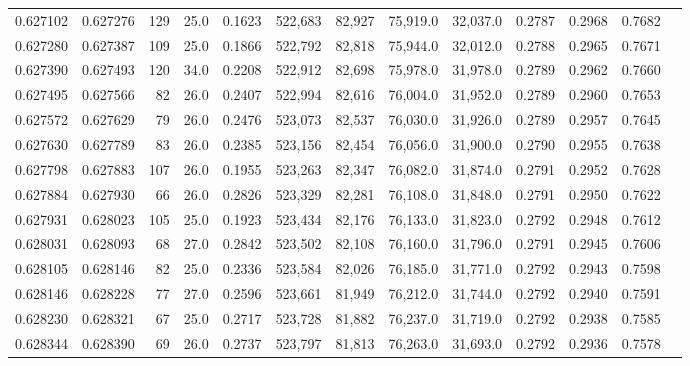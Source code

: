 \begin{tabular}{rrrrrrrrrrrrr}
0.627102 & 0.627276 &   129 & 25.0 &                                     0.1623 & 522,683 &  82,927 &  75,919.0 &  32,037.0 & 0.2787 & 0.2968 & 0.7682 \\
0.627280 & 0.627387 &   109 & 25.0 &                                     0.1866 & 522,792 &  82,818 &  75,944.0 &  32,012.0 & 0.2788 & 0.2965 & 0.7671 \\
0.627390 & 0.627493 &   120 & 34.0 &                                     0.2208 & 522,912 &  82,698 &  75,978.0 &  31,978.0 & 0.2789 & 0.2962 & 0.7660 \\
0.627495 & 0.627566 &    82 & 26.0 &                                     0.2407 & 522,994 &  82,616 &  76,004.0 &  31,952.0 & 0.2789 & 0.2960 & 0.7653 \\
0.627572 & 0.627629 &    79 & 26.0 &                                     0.2476 & 523,073 &  82,537 &  76,030.0 &  31,926.0 & 0.2789 & 0.2957 & 0.7645 \\
0.627630 & 0.627789 &    83 & 26.0 &                                     0.2385 & 523,156 &  82,454 &  76,056.0 &  31,900.0 & 0.2790 & 0.2955 & 0.7638 \\
0.627798 & 0.627883 &   107 & 26.0 &                                     0.1955 & 523,263 &  82,347 &  76,082.0 &  31,874.0 & 0.2791 & 0.2952 & 0.7628 \\
0.627884 & 0.627930 &    66 & 26.0 &                                     0.2826 & 523,329 &  82,281 &  76,108.0 &  31,848.0 & 0.2791 & 0.2950 & 0.7622 \\
0.627931 & 0.628023 &   105 & 25.0 &                                     0.1923 & 523,434 &  82,176 &  76,133.0 &  31,823.0 & 0.2792 & 0.2948 & 0.7612 \\
0.628031 & 0.628093 &    68 & 27.0 &                                     0.2842 & 523,502 &  82,108 &  76,160.0 &  31,796.0 & 0.2791 & 0.2945 & 0.7606 \\
0.628105 & 0.628146 &    82 & 25.0 &                                     0.2336 & 523,584 &  82,026 &  76,185.0 &  31,771.0 & 0.2792 & 0.2943 & 0.7598 \\
0.628146 & 0.628228 &    77 & 27.0 &                                     0.2596 & 523,661 &  81,949 &  76,212.0 &  31,744.0 & 0.2792 & 0.2940 & 0.7591 \\
0.628230 & 0.628321 &    67 & 25.0 &                                     0.2717 & 523,728 &  81,882 &  76,237.0 &  31,719.0 & 0.2792 & 0.2938 & 0.7585 \\
0.628344 & 0.628390 &    69 & 26.0 &                                     0.2737 & 523,797 &  81,813 &  76,263.0 &  31,693.0 & 0.2792 & 0.2936 & 0.7578 \\

\end{tabular}
